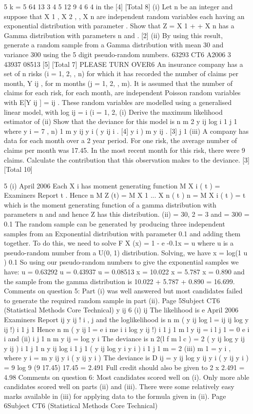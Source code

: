 5
k = 5
64%
13%
3%
4%
5%
12%
9%
4%
6%
4%
in the
[4]
[Total 8]
(i) Let n be an integer and suppose that X 1 , X 2 , , X n are independent random
variables each having an exponential distribution with parameter . Show that
Z = X 1 + + X n has a Gamma distribution with parameters n and .
[2]
(ii) By using this result, generate a random sample from a Gamma distribution
with mean 30 and variance 300 using the 5 digit pseudo-random numbers.
63293
CT6 A2006 3
43937
08513
[5]
[Total 7]
PLEASE TURN OVER6
An insurance company has a set of n risks (i = 1, 2, , n) for which it has recorded
the number of claims per month, Y ij , for m months (j = 1, 2, , m).
It is assumed that the number of claims for each risk, for each month, are independent
Poisson random variables with
E[Y ij ] =
ij .
These random variables are modelled using a generalised linear model, with
log
ij
=
i
(i = 1, 2,
(i) Derive the maximum likelihood estimator of
(ii) Show that the deviance for this model is
n
m
2
y ij log
i 1 j 1
where y i =
7
, n)
1
m
y ij
y i
( y ij
i .
[4]
y i )
m
y ij .
[3]
j 1
(iii) A company has data for each month over a 2 year period. For one risk, the
average number of claims per month was 17.45. In the most recent month for
this risk, there were 9 claims. Calculate the contribution that this observation
makes to the deviance.
[3]
[Total 10]


5
(i)
April 2006
Each X i has moment generating function M X i ( t ) =
Examiners Report
t
. Hence
n
M Z (t) = M X 1
... X n ( t )
n
= M X i ( t ) =
t
which is the moment generating function of a gamma distribution with
parameters n and and hence Z has this distribution.
(ii)
= 30,
2
= 3 and
= 300
= 0.1
The random sample can be generated by producing three independent samples
from an Exponential distribution with parameter 0.1 and adding them together.
To do this, we need to solve
F X (x) = 1 - e -0.1x = u
where u is a pseudo-random number from a U(0, 1) distribution.
Solving, we have x =
log(1 u )
0.1
So using our pseudo-random numbers to give the exponential samples we
have:
u = 0.63292
u = 0.43937
u = 0.08513
x = 10.022
x = 5.787
x = 0.890
and the sample from the gamma distribution is
10.022 + 5.787 + 0.890 = 16.699.
Comments on question 5: Part (i) was well answered but most candidates failed to generate
the required random sample in part (ii).
Page 5Subject CT6 (Statistical Methods Core Technical)
y ij
6
(i)
ij
The likelihood is
e
April 2006
Examiners Report
ij
y ij !
i , j
and the loglikelihood is
n
m
( y ij log
l =
ij
ij
log y ij !)
i 1 j 1
Hence
n
m
( y ij
l =
e i
me i
i
log y ij !)
i 1 j 1
m
l
y ij
=
i
l
j 1
= 0
e
i
i
and
(ii)
i
j 1
n m
y ij
= log y i
The deviance is
n
2(l f
m
l c ) = 2
( y ij log y ij
y ij )
i 1 j 1
n
y ij log
i 1 j 1
( y ij log y i
y i )
i 1 j 1
m
= 2
(iii)
m
1
= y i , where y i =
m
y ij
y i
( y ij
y i )
The deviance is
D ij = y ij log
y ij
y i
( y ij
y i ) = 9 log
9
(9 17.45)
17.45
= 2.491
Full credit should also be given to 2 x 2.491 = 4.98
Comments on question 6: Most candidates scored well on (i). Only more able candidates
scored well on parts (ii) and (iii). There were some relatively easy marks available in (iii) for
applying data to the formula given in (ii).
Page 6Subject CT6 (Statistical Methods Core Technical)
